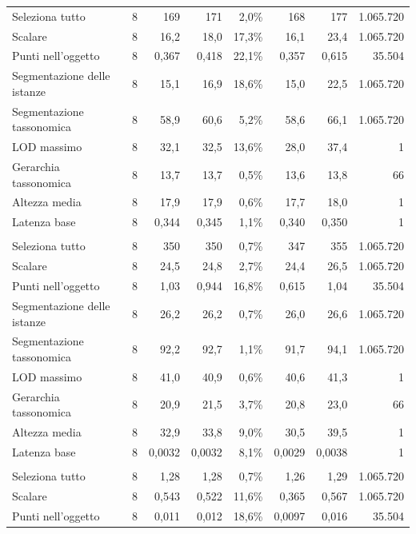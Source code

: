 \begin{small}
\begin{longtable}{lrrrrrr r}
\quad Seleziona tutto & 8 & 169 & 171 & 2,0\% & 168 & 177 & 1.065.720 \\
\quad Scalare & 8 & 16,2 & 18,0 & 17,3\% & 16,1 & 23,4 & 1.065.720 \\
\quad Punti nell'oggetto & 8 & 0,367 & 0,418 & 22,1\% & 0,357 & 0,615 & 35.504 \\
\quad Segmentazione delle istanze & 8 & 15,1 & 16,9 & 18,6\% & 15,0 & 22,5 & 1.065.720 \\
\quad Segmentazione tassonomica & 8 & 58,9 & 60,6 & 5,2\% & 58,6 & 66,1 & 1.065.720 \\
\quad LOD massimo & 8 & 32,1 & 32,5 & 13,6\% & 28,0 & 37,4 & 1 \\
\quad Gerarchia tassonomica & 8 & 13,7 & 13,7 & 0,5\% & 13,6 & 13,8 & 66 \\
\quad Altezza media & 8 & 17,9 & 17,9 & 0,6\% & 17,7 & 18,0 & 1 \\
\quad Latenza base & 8 & 0,344 & 0,345 & 1,1\% & 0,340 & 0,350 & 1 \\
\addlinespace
\multicolumn{8}{l}{\textbf{RDFLib+BDB}}\\
\quad Seleziona tutto & 8 & 350 & 350 & 0,7\% & 347 & 355 & 1.065.720 \\
\quad Scalare & 8 & 24,5 & 24,8 & 2,7\% & 24,4 & 26,5 & 1.065.720 \\
\quad Punti nell'oggetto & 8 & 1,03 & 0,944 & 16,8\% & 0,615 & 1,04 & 35.504 \\
\quad Segmentazione delle istanze & 8 & 26,2 & 26,2 & 0,7\% & 26,0 & 26,6 & 1.065.720 \\
\quad Segmentazione tassonomica & 8 & 92,2 & 92,7 & 1,1\% & 91,7 & 94,1 & 1.065.720 \\
\quad LOD massimo & 8 & 41,0 & 40,9 & 0,6\% & 40,6 & 41,3 & 1 \\
\quad Gerarchia tassonomica & 8 & 20,9 & 21,5 & 3,7\% & 20,8 & 23,0 & 66 \\
\quad Altezza media & 8 & 32,9 & 33,8 & 9,0\% & 30,5 & 39,5 & 1 \\
\quad Latenza base & 8 & 0,0032 & 0,0032 & 8,1\% & 0,0029 & 0,0038 & 1 \\
\addlinespace
\multicolumn{8}{l}{\textbf{RDFox}}\\
\quad Seleziona tutto & 8 & 1,28 & 1,28 & 0,7\% & 1,26 & 1,29 & 1.065.720 \\
\quad Scalare & 8 & 0,543 & 0,522 & 11,6\% & 0,365 & 0,567 & 1.065.720 \\
\quad Punti nell'oggetto & 8 & 0,011 & 0,012 & 18,6\% & 0,0097 & 0,016 & 35.504 \\

\end{longtable}
\end{small}
